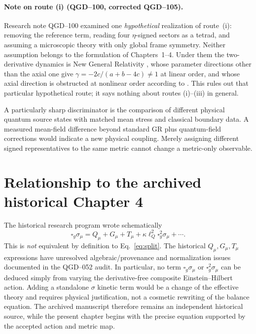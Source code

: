 \documentclass[11pt,a4paper]{article}
\begin{document}
\paragraph{Note on route (i) (QGD--100, corrected QGD--105).}
Research note QGD--100 examined one \emph{hypothetical} realization of route~(i):
removing the reference term, reading four $\eta$-signed sectors as a tetrad, and
assuming a microscopic theory with only global frame symmetry. Neither assumption
belongs to the formulation of Chapters~1--4. Under them the two-derivative
dynamics is New General Relativity \cite{HS}, whose parameter directions other than the
axial one give $\gamma=-2c/(a+b-4c)\ne1$ at linear order, and whose axial
direction is obstructed at nonlinear order according to \cite{BJD}.
This rules out that particular hypothetical route; it says nothing about
routes (i)--(iii) in general.

A particularly sharp discriminator is the comparison of different
physical quantum source states with matched mean stress and classical
boundary data. A measured mean-field difference beyond standard
GR plus quantum-field corrections would indicate a new physical
coupling. Merely assigning different signed representatives to the
same metric cannot change a metric-only observable.

\section{Relationship to the archived historical Chapter 4}
\label{sec:historical}
The historical research program wrote schematically
\begin{equation}\label{eq:historical}
\square_g\sigma_\mu=Q_\mu+G_\mu+T_\mu
+\kappa\ell_Q^2\square_g^2\sigma_\mu+\cdots.
\end{equation}
This is \emph{not} equivalent by definition to
Eq.~\eqref{eq:split}. The historical $Q_\mu,G_\mu,T_\mu$
expressions have unresolved algebraic/provenance and normalization
issues documented in the QGD--052 audit. In particular, no term
$\square_g\sigma_\mu$ or $\square_g^2\sigma_\mu$
can be deduced simply from varying the derivative-free composite
Einstein--Hilbert action. Adding a standalone $\sigma$ kinetic term
would be a change of the effective theory and requires physical
justification, not a cosmetic rewriting of the balance equation.
The archived manuscript therefore remains an independent historical
source, while the present chapter begins with the precise equation
supported by the accepted action and metric map.
\end{document}
